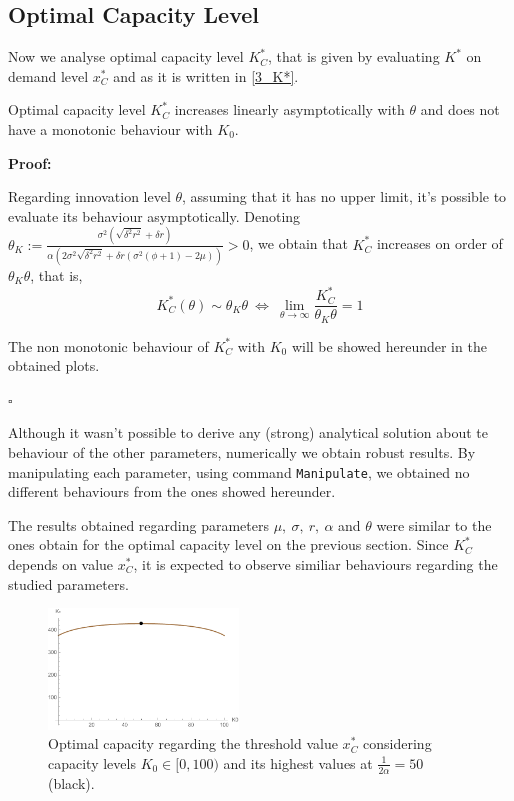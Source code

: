 \subsection{Optimal Capacity Level}

Now we analyse optimal capacity level $K^*_C$, that is given by evaluating $K^*$ on demand level $x^*_C$ and as it is written in \eqref{3_K*}.

\begin{prop}
Optimal capacity level $K^*_C$ increases linearly asymptotically with $\theta$ and does not have a monotonic behaviour with $K_0$. 
\end{prop}

\textbf{Proof:}

Regarding innovation level $\theta$, assuming that it has no upper limit, it's possible to evaluate its behaviour asymptotically. Denoting $\theta_K:=\frac{\sigma ^2 \left(\sqrt{\delta ^2 r^2}+\delta  r\right)}{\alpha  \left(2 \sigma ^2 \sqrt{\delta ^2 r^2}+\delta  r \left(\sigma ^2 (\phi +1)-2 \mu \right)\right)}>0$, we obtain that $K^*_C$ increases on order of $\theta_K \theta$, that is,
$$K^*_C(\theta) \sim \theta_K \theta \ \Leftrightarrow \ \lim_{\theta \to \infty}  \frac{K^*_C}{\theta_K \theta}=1 $$


The non monotonic behaviour of $K^*_C$ with $K_0$ will be showed hereunder in the obtained plots.
\begin{flushright}
	$\square$
\end{flushright}

Although it wasn't possible to derive any (strong) analytical solution about te behaviour of the other parameters, numerically we obtain robust results. By manipulating each parameter, using command \texttt{Manipulate}, we obtained no different behaviours from the ones showed hereunder.

The results obtained regarding parameters $\mu, \ \sigma,\ r, \ \alpha$ and $\theta$  were similar to the ones obtain for the optimal capacity level on the previous section.  Since $K^*_C$ depends on value $x_C^*$, it is expected to observe similiar behaviours regarding the studied parameters. 


\begin{figure}[!htb]
	\centering
	\includegraphics[width=0.45\textwidth]{Prob2_CapOpt/koptx_k0.pdf}
	\caption{Optimal capacity regarding the threshold value $x^*_C$ considering capacity levels $K_0 \in [0, 100)$ and its highest values at $\frac{1}{2 \alpha}=50$ (black).}
	\label{fig:2_k0}
\end{figure}

